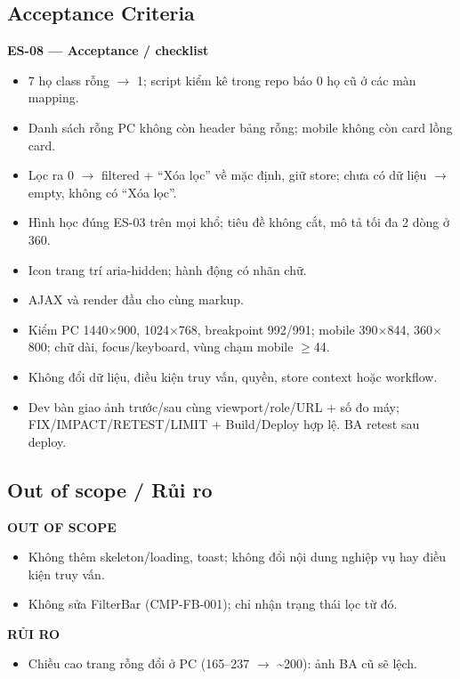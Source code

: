 \documentclass[11pt,a4paper]{report}
\begin{document}
\subsection*{Acceptance Criteria}
\par\smallskip\textbf{ES-08 — Acceptance / checklist}\par
\begin{itemize}[label=$\square$]
\item 7 họ class rỗng \(\to\) 1; script kiểm kê trong repo báo 0 họ cũ ở các màn mapping.
\item Danh sách rỗng PC không còn header bảng rỗng; mobile không còn card lồng card.
\item Lọc ra 0 \(\to\) filtered + “Xóa lọc” về mặc định, giữ store; chưa có dữ liệu \(\to\) empty, không có “Xóa lọc”.
\item Hình học đúng ES-03 trên mọi khổ; tiêu đề không cắt, mô tả tối đa 2 dòng ở 360.
\item Icon trang trí aria-\allowbreak{}hidden; hành động có nhãn chữ.
\item AJAX và render đầu cho cùng markup.
\item Kiểm PC 1440\(\times\)900, 1024\(\times\)768, breakpoint 992/\allowbreak{}991; mobile 390\(\times\)844, 360\(\times\)800; chữ dài, focus/\allowbreak{}keyboard, vùng chạm mobile \(\geq\)44.
\item Không đổi dữ liệu, điều kiện truy vấn, quyền, store context hoặc workflow.
\item Dev bàn giao ảnh trước/\allowbreak{}sau cùng viewport/\allowbreak{}role/\allowbreak{}URL + số đo máy; FIX/\allowbreak{}IMPACT/\allowbreak{}RETEST/\allowbreak{}LIMIT + Build/\allowbreak{}Deploy hợp lệ. BA retest sau deploy.
\end{itemize}
\subsection*{Out of scope / Rủi ro}
\par\smallskip\textbf{OUT OF SCOPE}\par
\begin{itemize}
\item Không thêm skeleton/\allowbreak{}loading, toast; không đổi nội dung nghiệp vụ hay điều kiện truy vấn.
\item Không sửa FilterBar (CMP-FB-001); chỉ nhận trạng thái lọc từ đó.
\end{itemize}

\par\smallskip\textbf{RỦI RO}\par
\begin{itemize}
\item Chiều cao trang rỗng đổi ở PC (165–237 \(\to\) \textasciitilde{}200): ảnh BA cũ sẽ lệch.
\end{itemize}
\end{document}
